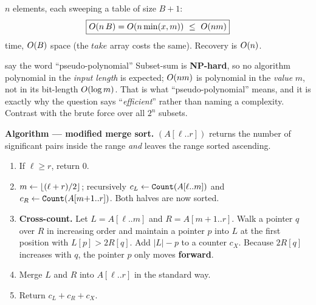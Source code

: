 \begin{cplx}
$n$ elements, each sweeping a table of size $B+1$:
\[
  \boxed{\Oh{n\,B}=\Oh{n\min(x,m)}\ \le\ \Oh{nm}}
\]
time, $O(B)$ space (the $\mathit{take}$ array costs the same). Recovery is $O(n)$.
\end{cplx}

\begin{facts}{say the word ``pseudo-polynomial''}
Subset-sum is \textbf{NP-hard}, so no algorithm polynomial in the \emph{input length} is expected;
$O(nm)$ is polynomial in the \emph{value} $m$, not in its bit-length $O(\log m)$. That is what
``pseudo-polynomial'' means, and it is exactly why the question says ``\emph{efficient}'' rather
than naming a complexity. Contrast with the brute force over all $2^n$ subsets.
\end{facts}

\textbf{Algorithm --- modified merge sort.} $(A[\ell..r])$ returns the number of
significant pairs inside the range \emph{and} leaves the range sorted ascending.
\begin{enumerate}
  \item If $\ell\ge r$, return $0$.
  \item $m\leftarrow\left\lfloor (\ell+r)/2 \right\rfloor$; recursively
        $c_L\leftarrow\texttt{Count}(A[\ell..m])$ and $c_R\leftarrow\texttt{Count}(A[m{+}1..r])$.
        Both halves are now sorted.
  \item \textbf{Cross-count.} Let $L=A[\ell..m]$ and $R=A[m{+}1..r]$. Walk a pointer $q$ over $R$
        in increasing order and maintain a pointer $p$ into $L$ at the first position with
        $L[p]>2R[q]$. Add $|L|-p$ to a counter $c_X$. Because $2R[q]$ increases with $q$, the
        pointer $p$ only moves \textbf{forward}.
  \item Merge $L$ and $R$ into $A[\ell..r]$ in the standard way.
  \item Return $c_L+c_R+c_X$.
\end{enumerate}

